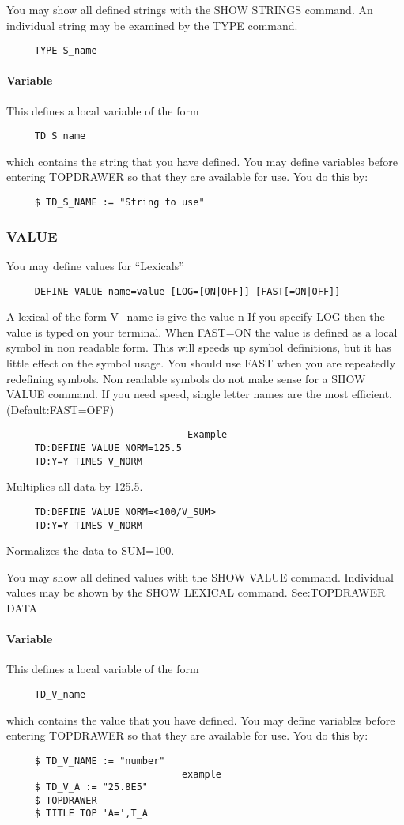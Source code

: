 You  may  show  all  defined strings with the SHOW STRINGS command.  An
individual string may be examined by the TYPE command.  
\begin{verbatim}
     TYPE S_name 
\end{verbatim}
\paragraph{Variable}
This defines a local variable of the form 
\begin{verbatim}
     TD_S_name 
\end{verbatim}
which  contains  the  string  that  you have defined.  You may define
variables before entering TOPDRAWER so that they  are  available  for
use.  You do this by:  
\begin{verbatim}
     $ TD_S_NAME := "String to use" 
\end{verbatim}
\subsubsection{VALUE}
You may define values for ``Lexicals'' 
\begin{verbatim}
     DEFINE VALUE name=value [LOG=[ON|OFF]] [FAST[=ON|OFF]] 
\end{verbatim}
A  lexical  of  the  form V\_name is give the value n If you specify LOG
then the value is typed on your terminal.  When FAST=ON  the  value  is
defined  as  a  local symbol in non readable form.  This will speeds up
symbol definitions, but it has little effect on the symbol usage.   You
should  use  FAST  when  you  are  repeatedly  redefining symbols.  Non
readable symbols do not make sense for a SHOW VALUE  command.   If  you
need speed, single letter names are the most efficient.  
(Default:FAST=OFF) 

\begin{verbatim}
                                Example
     TD:DEFINE VALUE NORM=125.5 
     TD:Y=Y TIMES V_NORM 
\end{verbatim}
Multiplies all data by 125.5.  
\begin{verbatim}
     TD:DEFINE VALUE NORM=<100/V_SUM> 
     TD:Y=Y TIMES V_NORM 
\end{verbatim}
Normalizes the data to SUM=100.  

You   may   show  all  defined  values  with  the  SHOW VALUE  command.
Individual  values  may  be  shown   by   the   SHOW LEXICAL   command.
See:TOPDRAWER DATA 
\paragraph{Variable}
This defines a local variable of the form 
\begin{verbatim}
     TD_V_name 
\end{verbatim}
which  contains  the  value  that  you  have defined.  You may define
variables before entering TOPDRAWER so that they  are  available  for
use.  You do this by:  
\begin{verbatim}
     $ TD_V_NAME := "number" 
                               example
     $ TD_V_A := "25.8E5" 
     $ TOPDRAWER 
     $ TITLE TOP 'A=',T_A 
\end{verbatim}
